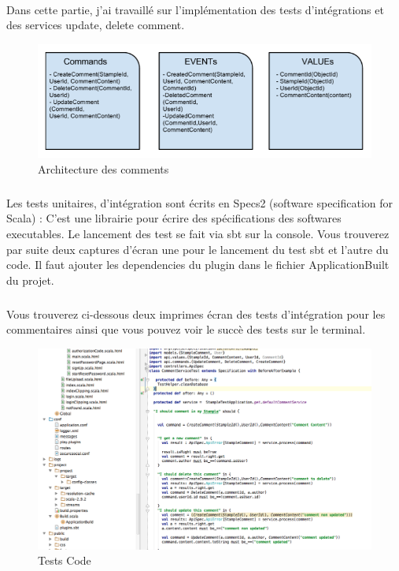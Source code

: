 \paragraph{}
Dans cette partie, j'ai travaillé sur l'implémentation des tests d'intégrations et des services update, delete comment.
\begin{figure}[H]
        \centering
                \centering
                \includegraphics[width=\textwidth]{Comment.png}
               \caption{Architecture des comments}
		\label{fig:Design des commentaires}
\end{figure}
\subparagraph{}
Les tests unitaires, d'intégration sont écrits en Specs2 (software specification for Scala) : C'est une librairie pour écrire des spécifications des softwares executables. Le lancement des test se fait via sbt sur la console.
Vous trouverez par suite deux captures d'écran une pour le lancement du test sbt et l'autre du code.
Il faut ajouter les dependencies du plugin dans le fichier ApplicationBuilt du projet.
\newpage
\subparagraph{}
Vous trouverez ci-dessous deux imprimes écran des tests d'intégration pour les commentaires ainsi que vous pouvez voir le succè des tests sur le terminal.
\begin{figure}[H]
        \centering
                \centering
                \includegraphics[width=\textwidth]{test.png}
               \caption{Tests Code}
		\label{fig:Test Code}
\end{figure}
